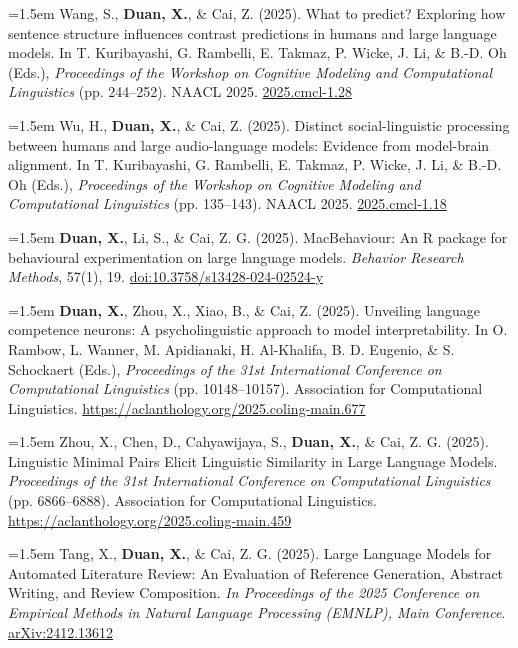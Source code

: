 \documentclass[11pt,a4paper]{article}
\begin{document}
\hangindent=1.5em  Wang, S., \textbf{Duan, X.}, \& Cai, Z. (2025). What to predict? Exploring how sentence structure influences contrast predictions in humans and large language models. In T. Kuribayashi, G. Rambelli, E. Takmaz, P. Wicke, J. Li, \& B.-D. Oh (Eds.), \textit{Proceedings of the Workshop on Cognitive Modeling and Computational Linguistics} (pp. 244–252). NAACL 2025. \href{https://aclanthology.org/2025.cmcl-1.28/}{2025.cmcl-1.28}

\hangindent=1.5em  Wu, H., \textbf{Duan, X.}, \& Cai, Z. (2025). Distinct social-linguistic processing between humans and large audio-language models: Evidence from model-brain alignment. In T. Kuribayashi, G. Rambelli, E. Takmaz, P. Wicke, J. Li, \& B.-D. Oh (Eds.), \textit{Proceedings of the Workshop on Cognitive Modeling and Computational Linguistics} (pp. 135–143). NAACL 2025. \href{https://aclanthology.org/2025.cmcl-1.18/}{2025.cmcl-1.18}

\hangindent=1.5em  \textbf{Duan, X.}, Li, S., \& Cai, Z. G. (2025). MacBehaviour: An R package for behavioural experimentation on large language models. \textit{Behavior Research Methods}, 57(1), 19. \href{https://doi.org/10.3758/s13428-024-02524-y}{doi:10.3758/s13428-024-02524-y}

\hangindent=1.5em  \textbf{Duan, X.}, Zhou, X., Xiao, B., \& Cai, Z. (2025). Unveiling language competence neurons: A psycholinguistic approach to model interpretability. In O. Rambow, L. Wanner, M. Apidianaki, H. Al-Khalifa, B. D. Eugenio, \& S. Schockaert (Eds.), \textit{Proceedings of the 31st International Conference on Computational Linguistics} (pp. 10148–10157). Association for Computational Linguistics. \href{https://aclanthology.org/2025.coling-main.677/}{https://aclanthology.org/2025.coling-main.677}

\hangindent=1.5em  Zhou, X., Chen, D., Cahyawijaya, S., \textbf{Duan, X.}, \& Cai, Z. G. (2025). Linguistic Minimal Pairs Elicit Linguistic Similarity in Large Language Models. \textit{Proceedings of the 31st International Conference on Computational Linguistics} (pp. 6866–6888). Association for Computational Linguistics. \href{https://aclanthology.org/2025.coling-main.459/}{https://aclanthology.org/2025.coling-main.459}

\hangindent=1.5em  Tang, X., \textbf{Duan, X.}, \& Cai, Z. G. (2025). Large Language Models for Automated Literature Review: An Evaluation of Reference Generation, Abstract Writing, and Review Composition. \textit{In Proceedings of the 2025 Conference on Empirical Methods in Natural Language Processing (EMNLP), Main Conference}. \href{https://doi.org/10.48550/arXiv.2412.13612}{arXiv:2412.13612}
\end{document}
